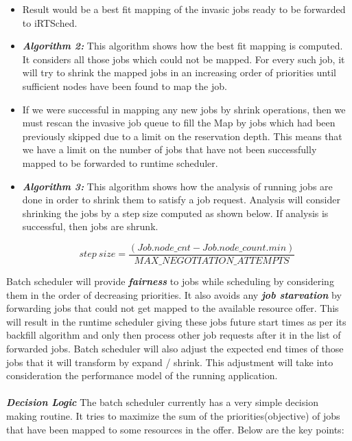 \begin{itemize}
\item Result would be a best fit mapping of the invasic jobs ready to be forwarded to iRTSched.
\item \textbf{\textit{Algorithm 2:}} This algorithm shows how the best fit mapping is computed. It considers all those jobs which could not be mapped. For every such job, it will try to shrink the mapped jobs in an increasing order of priorities until sufficient nodes have been found to map the job. 
\item If we were successful in mapping any new jobs by shrink operations, then we must rescan the invasive job queue to fill the Map by jobs which had been previously skipped due to a limit on the reservation depth. This means that we have a limit on the number of jobs that have not been successfully mapped to be forwarded to runtime scheduler.
\item \textbf{\textit{Algorithm 3:}} This algorithm shows how the analysis of running jobs are done in order to shrink them to satisfy a job request. Analysis will consider shrinking the jobs by a step size computed as shown below. If analysis is successful, then jobs are shrunk.
\vspace{-0.30in}
\begin{center}
\boldmath\begin{equation*}
step\ size = \frac{(Job.node\_cnt - Job.node\_count.min)}{MAX\_NEGOTIATION\_ATTEMPTS}
\end{equation*}
\end{center}
\end{itemize}
Batch scheduler will provide \textbf{\textit{fairness}} to jobs while scheduling by considering them in the order of decreasing priorities. It also avoids any \textbf{\textit{job starvation}} by forwarding jobs that could not get mapped to the available resource offer. This will result in the runtime scheduler giving these jobs future start times as per its backfill algorithm and only then process other job requests after it  in the list of forwarded jobs. Batch scheduler will also adjust the expected end times of those jobs that it will transform by expand / shrink. This adjustment will take into consideration the performance model of the running application.\\ \\
\textbf{\textit{Decision Logic}} The batch scheduler currently has a very simple decision making routine. It tries to maximize the sum of the priorities(objective) of jobs that have been mapped to some resources in the offer. Below are the key points:
